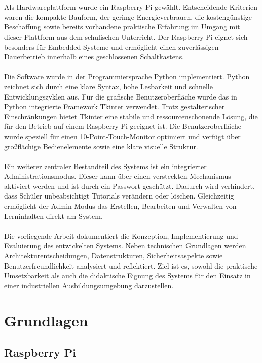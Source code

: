 \documentclass[12pt,a4paper]{report}
\begin{document}
\\\\
Als Hardwareplattform wurde ein Raspberry Pi gewählt. Entscheidende Kriterien waren die kompakte Bauform, der geringe Energieverbrauch, die kostengünstige Beschaffung sowie bereits vorhandene praktische Erfahrung im Umgang mit dieser Plattform aus dem schulischen Unterricht. Der Raspberry Pi eignet sich besonders für Embedded-Systeme und ermöglicht einen zuverlässigen Dauerbetrieb innerhalb eines geschlossenen Schaltkastens.
\\\\
Die Software wurde in der Programmiersprache Python implementiert. Python zeichnet sich durch eine klare Syntax, hohe Lesbarkeit und schnelle Entwicklungszyklen aus. Für die grafische Benutzeroberfläche wurde das in Python integrierte Framework Tkinter verwendet. Trotz gestalterischer Einschränkungen bietet Tkinter eine stabile und ressourcenschonende Lösung, die für den Betrieb auf einem Raspberry Pi geeignet ist. Die Benutzeroberfläche wurde speziell für einen 10-Point-Touch-Monitor optimiert und verfügt über großflächige Bedienelemente sowie eine klare visuelle Struktur.
\\\\
Ein weiterer zentraler Bestandteil des Systems ist ein integrierter Administrationsmodus. Dieser kann über einen versteckten Mechanismus aktiviert werden und ist durch ein Passwort geschützt. Dadurch wird verhindert, dass Schüler unbeabsichtigt Tutorials verändern oder löschen. Gleichzeitig ermöglicht der Admin-Modus das Erstellen, Bearbeiten und Verwalten von Lerninhalten direkt am System.
\\\\
Die vorliegende Arbeit dokumentiert die Konzeption, Implementierung und Evaluierung des entwickelten Systems. Neben technischen Grundlagen werden Architekturentscheidungen, Datenstrukturen, Sicherheitsaspekte sowie Benutzerfreundlichkeit analysiert und reflektiert. Ziel ist es, sowohl die praktische Umsetzbarkeit als auch die didaktische Eignung des Systems für den Einsatz in einer industriellen Ausbildungsumgebung darzustellen.

\chapter{Grundlagen}

\section{Raspberry Pi}
\end{document}

